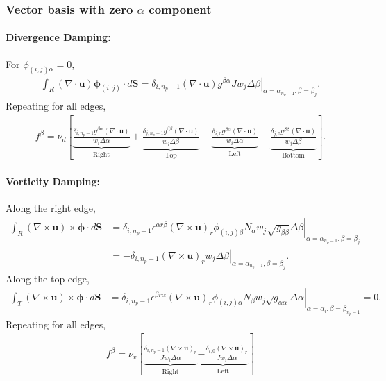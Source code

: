 \documentclass{article}
\newcommand{\vb}{\mathbf}
\newcommand{\vg}{\boldsymbol}
\begin{document}
\subsubsection{Vector basis with zero $\alpha$ component}

\paragraph{Divergence Damping:}  For $\phi_{(i,j)\alpha} = 0$,
\begin{align}
\int_R (\nabla \cdot \vb{u}) \vg{\phi}_{(i,j)} \cdot d\vb{S} = \delta_{i,n_p-1} \left. (\nabla \cdot \vb{u}) g^{\beta \alpha} J w_j \Delta \beta \right\vert_{\alpha = \alpha_{n_p-1}, \beta = \beta_j}.
\end{align}  Repeating for all edges,
\begin{align}
f^\beta = \nu_d \left[ \underbrace{\frac{\delta_{i,n_p-1} g^{\beta \alpha} (\nabla \cdot \vb{u})}{w_i \Delta \alpha}}_{\mbox{Right}} + \underbrace{\frac{\delta_{j,n_p-1} g^{\beta \beta} (\nabla \cdot \vb{u})}{w_j \Delta \beta}}_{\mbox{Top}} - \underbrace{\frac{\delta_{i,0} g^{\beta \alpha} (\nabla \cdot \vb{u})}{w_i \Delta \alpha}}_{\mbox{Left}} - \underbrace{\frac{\delta_{j,0} g^{\beta \beta} (\nabla \cdot \vb{u})}{w_j \Delta \beta}}_{\mbox{Bottom}} \right].
\end{align}

\paragraph{Vorticity Damping:}  Along the right edge,
\begin{align}
\int_R (\nabla \times \vb{u}) \times \vg{\phi} \cdot d\vb{S} &= \delta_{i,n_p-1} \left. \epsilon^{\alpha r \beta} (\nabla \times \vb{u})_r \phi_{(i,j) \beta} N_\alpha w_j \sqrt{g_{\beta \beta}} \Delta \beta \right\vert_{\alpha = \alpha_{n_p-1}, \beta = \beta_j} \\
&= - \delta_{i,n_p-1} \left. (\nabla \times \vb{u})_r w_j \Delta \beta \right\vert_{\alpha = \alpha_{n_p-1}, \beta = \beta_j}.
\end{align}  Along the top edge,
\begin{align}
\int_T (\nabla \times \vb{u}) \times \vg{\phi} \cdot d\vb{S} &= \delta_{i,n_p-1} \left. \epsilon^{\beta r \alpha} (\nabla \times \vb{u})_r \phi_{(i,j) \alpha} N_\beta w_j \sqrt{g_{\alpha \alpha}} \Delta \alpha  \right\vert_{\alpha = \alpha_{i}, \beta = \beta_{n_p-1}} = 0.
\end{align}  Repeating for all edges,
\begin{align}
f^\beta = \nu_v \left[ \underbrace{\frac{\delta_{i,n_p-1} (\nabla \times \vb{u})_r}{J w_i \Delta \alpha}}_{\mbox{Right}} \underbrace{- \frac{\delta_{i,0} (\nabla \times \vb{u})_r}{J w_i \Delta \alpha}}_{\mbox{Left}} \right]
\end{align}
\end{document}
